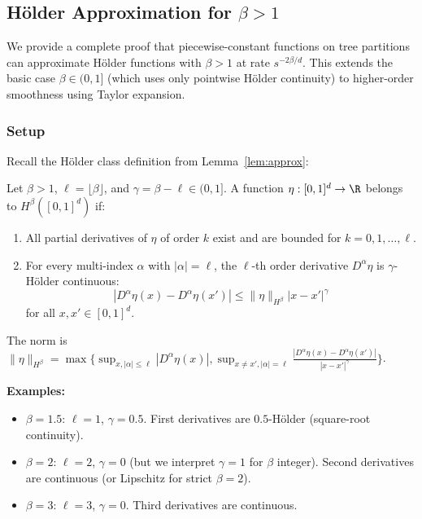 
\subsection{Hölder Approximation for $\beta > 1$}
\label{app:holder-beta-gt-1}

We provide a complete proof that piecewise-constant functions on tree partitions can approximate Hölder functions with $\beta > 1$ at rate $s^{-2\beta/d}$. This extends the basic case $\beta \in (0,1]$ (which uses only pointwise Hölder continuity) to higher-order smoothness using Taylor expansion.

\subsubsection{Setup}

Recall the Hölder class definition from Lemma~\ref{lem:approx}:

\begin{definition}
Let $\beta > 1$, $\ell = \lfloor \beta \rfloor$, and $\gamma = \beta - \ell \in (0,1]$. A function $\eta: [0,1]^d \to \R$ belongs to $H^\beta([0,1]^d)$ if:
\begin{enumerate}
\item All partial derivatives of $\eta$ of order $k$ exist and are bounded for $k = 0, 1, \ldots, \ell$.
\item For every multi-index $\alpha$ with $|\alpha| = \ell$, the $\ell$-th order derivative $D^\alpha \eta$ is $\gamma$-Hölder continuous:
\[
|D^\alpha \eta(x) - D^\alpha \eta(x')| \le \|\eta\|_{H^\beta} |x - x'|^\gamma
\]
for all $x, x' \in [0,1]^d$.
\end{enumerate}
The norm is $\|\eta\|_{H^\beta} = \max\bigl\{ \sup_{x,|\alpha| \le \ell} |D^\alpha \eta(x)|, \sup_{x \ne x', |\alpha|=\ell} \frac{|D^\alpha \eta(x) - D^\alpha \eta(x')|}{|x - x'|^\gamma} \bigr\}$.
\end{definition}

\textbf{Examples:}
\begin{itemize}
\item $\beta = 1.5$: $\ell = 1$, $\gamma = 0.5$. First derivatives are $0.5$-Hölder (square-root continuity).
\item $\beta = 2$: $\ell = 2$, $\gamma = 0$ (but we interpret $\gamma = 1$ for $\beta$ integer). Second derivatives are continuous (or Lipschitz for strict $\beta = 2$).
\item $\beta = 3$: $\ell = 3$, $\gamma = 0$. Third derivatives are continuous.
\end{itemize}

